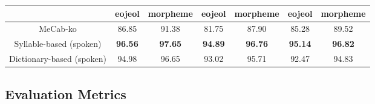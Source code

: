\documentclass[AMS,STIX2COL]{WileyNJD-v2}
\begin{document}
\begin{table}[]
\begin{tabular*}{500pt}{@{\extracolsep\fill}c|cccccc@{\extracolsep\fill}}
            \cmidrule{2-3} \cmidrule{4-5} \cmidrule{6-7}
            ~                                      & \multicolumn{1}{c}{eojeol} & \multicolumn{1}{c}{morpheme} & \multicolumn{1}{c}{eojeol} & \multicolumn{1}{c}{morpheme} & \multicolumn{1}{c}{eojeol} & \multicolumn{1}{c}{morpheme} \\
            \midrule
            \hspace{2mm}MeCab-ko                   & 86.85                      & 91.38                        & 81.75                      & 87.90                        & 85.28                      & 89.52                        \\
            \hspace{2mm}Syllable-based (spoken)    & \textbf{96.56}             & \textbf{97.65}               & \textbf{94.89}             & \textbf{96.76}               & \textbf{95.14}             & \textbf{96.82}               \\
            \hspace{2mm}Dictionary-based (spoken)  & 94.98                      & 96.65                        & 93.02                      & 95.71                        & 92.47                      & 94.83                        \\
            \bottomrule
        \end{tabular*}
    \end{table}

    \subsection{Evaluation Metrics}\label{subsec:evaluation-metrics}
\end{document}
